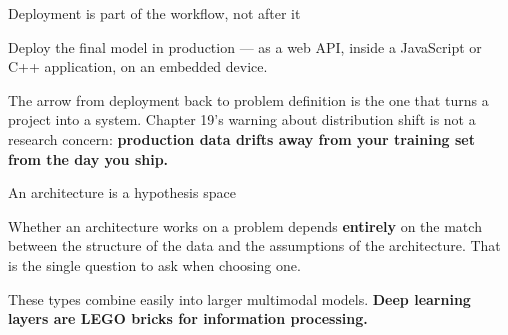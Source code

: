 \documentclass[aspectratio=169,11pt,t]{beamer}
\begin{document}
\begin{frame}[shrink=25]{Deployment is part of the workflow, not after it}
{\fontsize{9.4}{12.6}\selectfont\color{fg2}Deploy the final model in production --- as a web API, inside a JavaScript or C++ application, on an embedded device.\par}\vskip 4pt
{\fontsize{9.4}{12.6}\selectfont\color{fg2}The arrow from deployment back to problem definition is the one that turns a project into a system. Chapter 19's warning about distribution shift is not a research concern: \textbf{production data drifts away from your training set from the day you ship.}\par}\vskip 4pt
\end{frame}


\begin{frame}[shrink=25]{An architecture is a hypothesis space}
{\fontsize{9.4}{12.6}\selectfont\color{fg2}Whether an architecture works on a problem depends \textbf{entirely} on the match between the structure of the data and the assumptions of the architecture. That is the single question to ask when choosing one.\par}\vskip 4pt
\begin{iband}[signal]
These types combine easily into larger multimodal models. \textbf{Deep learning layers are LEGO bricks for information processing.}
\end{iband}
\end{frame}
\end{document}
